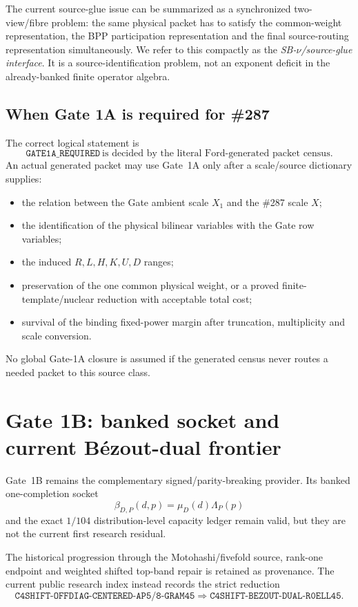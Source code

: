 \documentclass[11pt]{article}
\theoremstyle{definition}
\newcommand{\1}{\mathbf 1}
\begin{document}
The current source-glue issue can be summarized as a synchronized two-view/fibre problem:
the same physical packet has to satisfy the common-weight representation, the BPP
participation representation and the final source-routing representation simultaneously.
We refer to this compactly as the \emph{SB-$\nu$/source-glue interface}.  It is a
source-identification problem, not an exponent deficit in the already-banked finite
operator algebra.

\subsection{When Gate 1A is required for \#287}

The correct logical statement is
\[
\boxed{
\texttt{GATE1A\_REQUIRED}
\ \text{is decided by the literal Ford-generated packet census.}
}
\]
An actual generated packet may use Gate~1A only after a scale/source dictionary supplies:
\begin{itemize}[leftmargin=1.6em]
\item the relation between the Gate ambient scale $X_1$ and the \#287 scale $X$;
\item the identification of the physical bilinear variables with the Gate row variables;
\item the induced $R,L,H,K,U,D$ ranges;
\item preservation of the one common physical weight, or a proved finite-template/nuclear
  reduction with acceptable total cost;
\item survival of the binding fixed-power margin after truncation, multiplicity and
  scale conversion.
\end{itemize}
No global Gate-1A closure is assumed if the generated census never routes a needed packet
to this source class.

\section{Gate 1B: banked socket and current B\'ezout-dual frontier}
\label{sec:gate1b-ledger}

Gate~1B remains the complementary signed/parity-breaking provider.  Its banked
one-completion socket
\[
\beta_{D,P}(d,p)=\mu_D(d)\Lambda_P(p)
\]
and the exact $1/104$ distribution-level capacity ledger remain valid, but they are not
the current first research residual.

The historical progression through the Motohashi/fivefold source, rank-one endpoint and
weighted shifted top-band repair is retained as provenance.  The current public research
index instead records the strict reduction
\[
\texttt{C4SHIFT-OFFDIAG-CENTERED-AP5/8-GRAM45}
\Longrightarrow
\boxed{\texttt{C4SHIFT-BEZOUT-DUAL-R0ELL45}}.
\]
\end{document}
